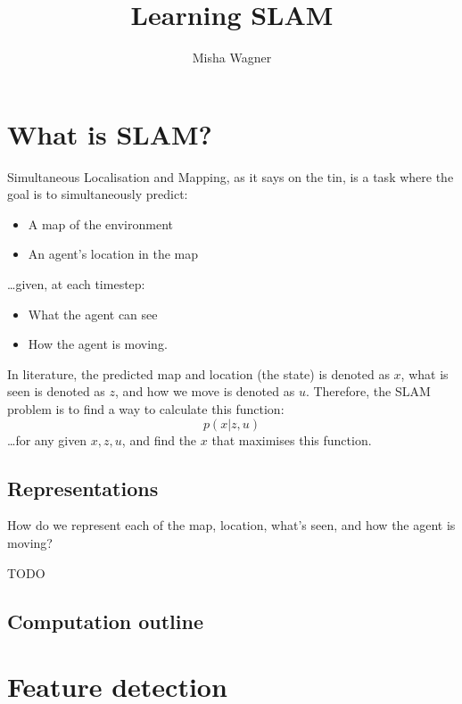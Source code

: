 \documentclass{article}
\title{Learning SLAM}
\author{Misha Wagner}
\begin{document}
\maketitle
{}

\section{What is SLAM?}

Simultaneous Localisation and Mapping, as it says on the tin, is a task where
the goal is to simultaneously predict:
\begin{itemize}
  \item A map of the environment
  \item An agent's location in the map
\end{itemize}
\dots given, at each timestep:
\begin{itemize}
  \item What the agent can see
  \item How the agent is moving.
\end{itemize}

In literature, the predicted map and location (the state) is denoted as $x$,
what is seen is denoted as $z$, and how we move is denoted as $u$. Therefore,
the SLAM problem is to find a way to calculate this function:
\begin{equation}
  p(x | z, u)
\end{equation}
\dots for any given $x, z, u$, and find the $x$ that maximises this function.

\subsection{Representations}

How do we represent each of the map, location, what's seen, and how the agent
is moving?

TODO

\subsection{Computation outline}

\section{Feature detection}
\end{document}
